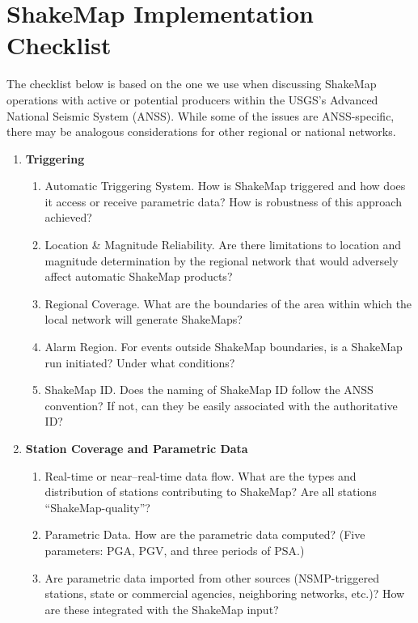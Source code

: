 \documentclass[letterpaper,10pt,english]{sphinxmanual}
\begin{document}
\section{ShakeMap Implementation Checklist}
\label{software_guide:shakemap-implementation-checklist}
The checklist below is based on the one we use when discussing ShakeMap operations with active or
potential producers within the USGS's Advanced National Seismic System (ANSS).
While some of the issues are ANSS-specific, there may be analogous considerations for
other regional or national networks.
\begin{enumerate}
\item {} 
\textbf{Triggering}
\begin{enumerate}
\item {} 
Automatic Triggering System.  How is ShakeMap triggered and how does it
access or receive parametric data?  How is robustness of this approach
achieved?

\item {} 
Location \& Magnitude Reliability.  Are there limitations to location and
magnitude determination by the regional network that would adversely affect
automatic ShakeMap products?

\item {} 
Regional Coverage.  What are the boundaries of the area within which the
local network will generate ShakeMaps?

\item {} 
Alarm Region.  For events outside ShakeMap boundaries, is a ShakeMap run
initiated?  Under what conditions?

\item {} 
ShakeMap ID.  Does the naming of ShakeMap ID follow the ANSS
convention?  If not, can they be easily associated with the authoritative ID?

\end{enumerate}

\item {} 
\textbf{Station Coverage and Parametric Data}
\begin{enumerate}
\item {} 
Real-time or near--real-time data flow.  What are the types and distribution of
stations contributing to ShakeMap? Are all stations ``ShakeMap-quality”?

\item {} 
Parametric Data.  How are the parametric data computed? (Five parameters:
PGA, PGV, and three periods of PSA.)

\item {} 
Are parametric data imported from other sources (NSMP-triggered stations,
state or commercial agencies, neighboring networks, etc.)? How are these
integrated with the ShakeMap input?


\end{enumerate}
\end{enumerate}
\end{document}
